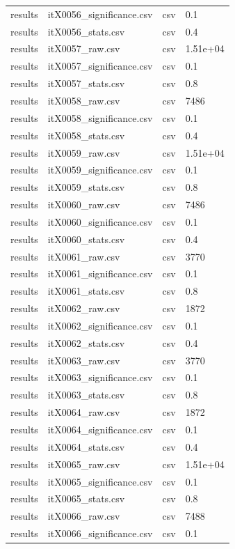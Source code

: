 \begin{landscape}
\begin{longtable}{p{}p{}p{}p{}}
results & itX0056\_significance.csv & csv & 0.1 \\
results & itX0056\_stats.csv & csv & 0.4 \\
results & itX0057\_raw.csv & csv & 1.51e+04 \\
results & itX0057\_significance.csv & csv & 0.1 \\
results & itX0057\_stats.csv & csv & 0.8 \\
results & itX0058\_raw.csv & csv & 7486 \\
results & itX0058\_significance.csv & csv & 0.1 \\
results & itX0058\_stats.csv & csv & 0.4 \\
results & itX0059\_raw.csv & csv & 1.51e+04 \\
results & itX0059\_significance.csv & csv & 0.1 \\
results & itX0059\_stats.csv & csv & 0.8 \\
results & itX0060\_raw.csv & csv & 7486 \\
results & itX0060\_significance.csv & csv & 0.1 \\
results & itX0060\_stats.csv & csv & 0.4 \\
results & itX0061\_raw.csv & csv & 3770 \\
results & itX0061\_significance.csv & csv & 0.1 \\
results & itX0061\_stats.csv & csv & 0.8 \\
results & itX0062\_raw.csv & csv & 1872 \\
results & itX0062\_significance.csv & csv & 0.1 \\
results & itX0062\_stats.csv & csv & 0.4 \\
results & itX0063\_raw.csv & csv & 3770 \\
results & itX0063\_significance.csv & csv & 0.1 \\
results & itX0063\_stats.csv & csv & 0.8 \\
results & itX0064\_raw.csv & csv & 1872 \\
results & itX0064\_significance.csv & csv & 0.1 \\
results & itX0064\_stats.csv & csv & 0.4 \\
results & itX0065\_raw.csv & csv & 1.51e+04 \\
results & itX0065\_significance.csv & csv & 0.1 \\
results & itX0065\_stats.csv & csv & 0.8 \\
results & itX0066\_raw.csv & csv & 7488 \\
results & itX0066\_significance.csv & csv & 0.1 \\

\end{longtable}
\end{landscape}
